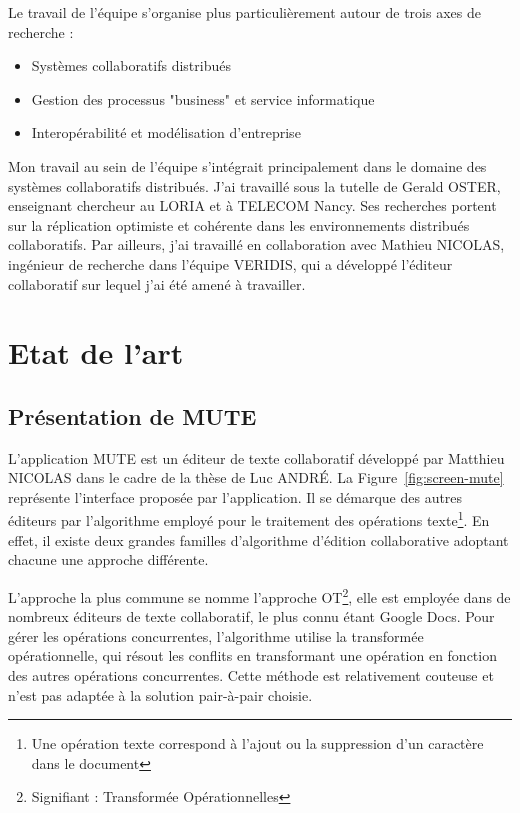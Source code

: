 \documentclass{tnreport}
\begin{document}
Le travail de l'équipe s'organise plus particulièrement autour de trois axes de recherche :

\begin{itemize}
  \item Systèmes collaboratifs distribués
  \item Gestion des processus "business" et service informatique
  \item Interopérabilité et modélisation d'entreprise
\end{itemize}

Mon travail au sein de l'équipe s'intégrait principalement dans le domaine des systèmes collaboratifs distribués. J'ai travaillé sous la tutelle de Gerald OSTER, enseignant chercheur au LORIA et à TELECOM Nancy. Ses recherches portent sur la réplication optimiste et cohérente dans les environnements distribués collaboratifs. Par ailleurs, j'ai travaillé en collaboration avec Mathieu NICOLAS, ingénieur de recherche dans l'équipe VERIDIS, qui a développé l'éditeur collaboratif sur lequel j'ai été amené à travailler.  

\cleardoublepage


\chapter{Etat de l'art}

\section{Présentation de MUTE}

L'application MUTE est un éditeur de texte collaboratif développé par Matthieu NICOLAS dans le cadre de la thèse de Luc ANDRÉ. La Figure~\ref{fig:screen-mute} représente l'interface proposée par l'application. Il se démarque des autres éditeurs par l'algorithme employé pour le traitement des opérations texte\footnote{Une opération texte correspond à l'ajout ou la suppression d'un caractère dans le document}. En effet, il existe deux grandes familles d'algorithme d'édition collaborative adoptant chacune une approche différente. 

L'approche la plus commune se nomme l'approche OT\footnote{Signifiant : Transformée Opérationnelles}, elle est employée dans de nombreux éditeurs de texte collaboratif, le plus connu étant Google Docs. Pour gérer les opérations concurrentes, l'algorithme utilise la transformée opérationnelle, qui résout les conflits en transformant une opération en fonction des autres opérations concurrentes. Cette méthode est relativement couteuse et n'est pas adaptée à la solution pair-à-pair choisie. 
\end{document}
